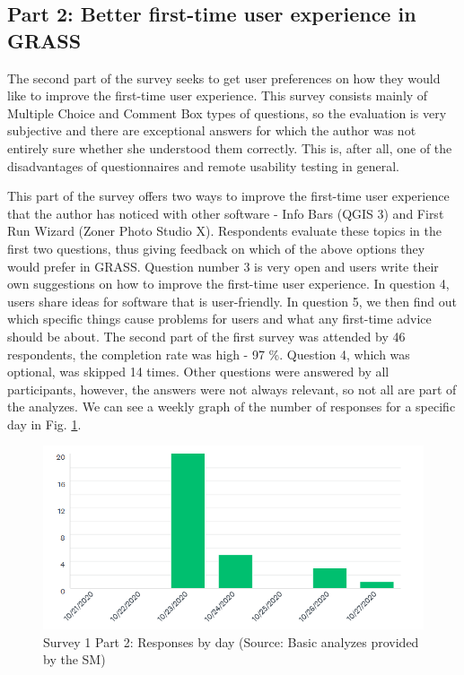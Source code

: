 \documentclass[a4paper,10pt,twoside]{article}
\begin{document}
\newpage
\vspace*{-1cm}
\subsection{Part 2: Better first-time user experience in GRASS}

\noindent The second part of the survey seeks to get user preferences on how they would like to improve the first-time user experience. This survey consists mainly of Multiple Choice and Comment Box types of questions, so the evaluation is very subjective and there are exceptional answers for which the author was not entirely sure whether she understood them correctly. This is, after all, one of the disadvantages of questionnaires and remote usability testing in general.

This part of the survey offers two ways to improve the first-time user experience that the author has noticed with other software - Info Bars (QGIS 3) and First Run Wizard (Zoner Photo Studio X). Respondents evaluate these topics in the first two questions, thus giving feedback on which of the above options they would prefer in GRASS. Question number 3 is very open and users write their own suggestions on how to improve the first-time user experience. In question 4, users share ideas for software that is user-friendly. In question 5, we then find out which specific things cause problems for users and what any first-time advice should be about. The second part of the first survey was attended by 46 respondents, the completion rate was high - 97 \%. Question 4, which was optional, was skipped 14 times. Other questions were answered by all participants, however, the answers were not always relevant, so not all are part of the analyzes. We can see a weekly graph of the number of responses for a specific day in Fig. \ref{fig:survey1_part2_insight2}.

\vspace{0.3cm}
\begin{figure}[hbt!] 
\begin{center}
\includegraphics[width=15cm]{../surveys/analyzed_data/survey1_part2_insight2.png} 
\caption[Survey 1 Part 2: Responses by day]{Survey 1 Part 2: Responses by day (Source: Basic analyzes provided by the SM)}
\label{fig:survey1_part2_insight2}
\end{center}
\end{figure}
\end{document}
